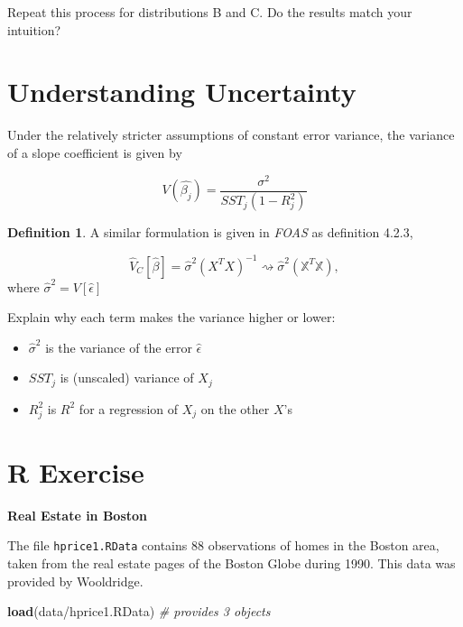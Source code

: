 \documentclass[
]{book}
\newenvironment{Shaded}{\begin{snugshade}}{\end{snugshade}}
\newcommand{\CommentTok}[1]{\textcolor[rgb]{0.56,0.35,0.01}{\textit{#1}}}
\newcommand{\FunctionTok}[1]{\textcolor[rgb]{0.13,0.29,0.53}{\textbf{#1}}}
\newcommand{\NormalTok}[1]{#1}
\newcommand{\StringTok}[1]{\textcolor[rgb]{0.31,0.60,0.02}{#1}}
\providecommand{\tightlist}{%
  \setlength{\itemsep}{0pt}\setlength{\parskip}{0pt}}
\theoremstyle{definition}
\newtheorem{definition}{Definition}[chapter]
\theoremstyle{definition}
\theoremstyle{definition}
\theoremstyle{definition}
\theoremstyle{remark}
\begin{document}
Repeat this process for distributions B and C. Do the results match your intuition?

\hypertarget{understanding-uncertainty-1}{%
\section{Understanding Uncertainty}\label{understanding-uncertainty-1}}

Under the relatively stricter assumptions of constant error variance, the variance of a slope coefficient is given by

\[
  V(\hat{\beta_j}) = \frac{\sigma^2}{SST_j (1-R_j^2)}
\]

\begin{definition}
A similar formulation is given in \emph{FOAS} as definition 4.2.3,

\[
  \hat{V}_{C}[\hat{\beta}] = \hat{\sigma}^2 \left( X^{T} X \right)^{-1} \rightsquigarrow \hat{\sigma}^{2}{\left(\mathbb{X}^{T}\mathbb{X}\right)}, 
\]
where \(\hat{\sigma}^{2} = V[\hat{\epsilon}]\)
\end{definition}

Explain why each term makes the variance higher or lower:

\begin{itemize}
\tightlist
\item
  \(\hat{\sigma}^2\) is the variance of the error \(\hat{\epsilon}\)
\item
  \(SST_j\) is (unscaled) variance of \(X_j\)
\item
  \(R_j^2\) is \(R^2\) for a regression of \(X_j\) on the other \(X\)'s
\end{itemize}

\hypertarget{r-exercise-1}{%
\section{R Exercise}\label{r-exercise-1}}

\textbf{Real Estate in Boston}

The file \texttt{hprice1.RData} contains 88 observations of homes in the Boston area, taken from the real estate pages of the Boston Globe during 1990. This data was provided by Wooldridge.

\begin{Shaded}
\begin{Highlighting}[]
\FunctionTok{load}\NormalTok{(}\StringTok{\textquotesingle{}data/hprice1.RData\textquotesingle{}}\NormalTok{) }\CommentTok{\# provides 3 objects }
\end{Highlighting}
\end{Shaded}
\end{document}
